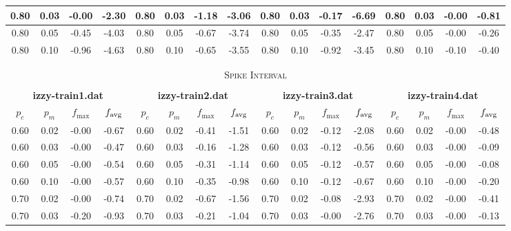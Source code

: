 {\begin{tabular}{c|c|c|c||c|c|c|c||c|c|c|c||c|c|c|c}
0.80 & 0.03 & {\cellcolor{green}-0.00} & -2.30 &    0.80 & 0.03 & -1.18 & -3.06 &    0.80 & 0.03 & -0.17 & -6.69 &    0.80 & 0.03 & {\cellcolor{green}-0.00} & -0.81 \\ \hline
0.80 & 0.05 & -0.45 & -4.03 &    0.80 & 0.05 & -0.67 & -3.74 &    0.80 & 0.05 & -0.35 & {\cellcolor{yellow}-2.47} &    0.80 & 0.05 & {\cellcolor{green}-0.00} & -0.26 \\ \hline
0.80 & 0.10 & -0.96 & -4.63 &    0.80 & 0.10 & -0.65 & -3.55 &    0.80 & 0.10 & -0.92 & -3.45 &    0.80 & 0.10 & -0.10 & -0.40 \\ \hline\hline


\multicolumn{16}{c}{ } \\\multicolumn{16}{c}{ } \\
\multicolumn{16}{c}{ \normalsize \textsc{Spike Interval}} \\ 
\multicolumn{16}{c}{ } \\
\multicolumn{4}{c}{ \textbf{izzy-train1.dat}} &    \multicolumn{4}{c}{ \textbf{izzy-train2.dat}} &    \multicolumn{4}{c}{ \textbf{izzy-train3.dat}} &    \multicolumn{4}{c}{ \textbf{izzy-train4.dat}} \\ \hline
$p_c$ & $p_m$ & $f_{\max}$ & $f_{\operatorname{avg}}$  &    $p_c$ & $p_m$ & $f_{\max}$ & $f_{\operatorname{avg}}$  &    $p_c$ & $p_m$ & $f_{\max}$ & $f_{\operatorname{avg}}$  &    $p_c$ & $p_m$ & $f_{\max}$ & $f_{\operatorname{avg}}$  \\ \hline\hline
0.60 & 0.02 & {\cellcolor{green}-0.00} & -0.67 &    0.60 & 0.02 & -0.41 & -1.51 &    0.60 & 0.02 & -0.12 & -2.08 &    0.60 & 0.02 & {\cellcolor{green}-0.00} & -0.48 \\ \hline
0.60 & 0.03 & {\cellcolor{green}-0.00} & -0.47 &    0.60 & 0.03 & {\cellcolor{green}-0.16} & -1.28 &    0.60 & 0.03 & -0.12 & -0.56 &    0.60 & 0.03 & {\cellcolor{green}-0.00} & -0.09 \\ \hline
0.60 & 0.05 & {\cellcolor{green}-0.00} & -0.54 &    0.60 & 0.05 & -0.31 & -1.14 &    0.60 & 0.05 & -0.12 & -0.57 &    0.60 & 0.05 & {\cellcolor{green}-0.00} & -0.08 \\ \hline
0.60 & 0.10 & {\cellcolor{green}-0.00} & -0.57 &    0.60 & 0.10 & -0.35 & -0.98 &    0.60 & 0.10 & -0.12 & -0.67 &    0.60 & 0.10 & {\cellcolor{green}-0.00} & -0.20 \\ \hline\hline
0.70 & 0.02 & {\cellcolor{green}-0.00} & -0.74 &    0.70 & 0.02 & -0.67 & -1.56 &    0.70 & 0.02 & -0.08 & -2.93 &    0.70 & 0.02 & {\cellcolor{green}-0.00} & -0.41 \\ \hline
0.70 & 0.03 & -0.20 & -0.93 &    0.70 & 0.03 & -0.21 & -1.04 &    0.70 & 0.03 & {\cellcolor{green}-0.00} & -2.76 &    0.70 & 0.03 & {\cellcolor{green}-0.00} & -0.13 \\ \hline

\end{tabular}}
